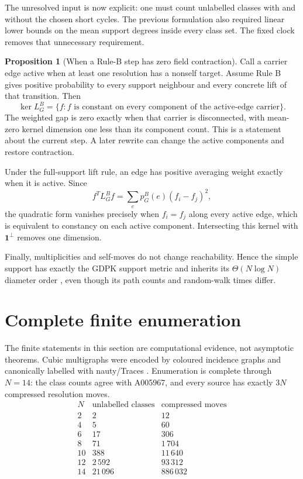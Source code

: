\documentclass[11pt]{article}
\makeatletter
\newcommand{\one}{\mathbf 1}
\theoremstyle{definition}
\newtheorem{proposition}[theorem]{Proposition}
\renewenvironment{proof}[1][\proofname]{\par
  \pushQED{\qed}%
  \normalfont \topsep6\p@\@plus6\p@\relax
  \trivlist
  \item[\hskip\labelsep\bfseries #1\@addpunct{.}]\ignorespaces
}{%
  \popQED\endtrivlist\@endpefalse
}
\makeatother
\begin{document}
The unresolved input is now explicit: one must count unlabelled classes with
and without the chosen short cycles.  The previous formulation also required
linear lower bounds on the mean support degrees inside every class set.  The
fixed clock removes that unnecessary requirement.

\begin{proposition}[When a Rule-B step has zero field contraction]
Call a carrier edge active when at least one resolution has a nonself target.
Assume Rule B gives positive probability to every support neighbour and every
concrete lift of that transition.  Then
\[
 \ker L_G^B
 =\{f:f\text{ is constant on every component of the active-edge carrier}\}.
\]
The weighted gap is zero exactly when that carrier is disconnected, with
mean-zero kernel dimension one less than its component count.  This is a
statement about the current step.  A later rewrite can change the active
components and restore contraction.
\end{proposition}

\begin{proof}
Under the full-support lift rule, an edge has positive averaging weight exactly
when it is active.  Since
\[
 f^TL_G^Bf=\sum_e p_G^B(e)(f_i-f_j)^2,
\]
the quadratic form vanishes precisely when $f_i=f_j$ along every active edge,
which is equivalent to constancy on each active component.  Intersecting this
kernel with $\one^\perp$ removes one dimension.
\end{proof}

Finally, multiplicities and self-moves do not change reachability.  Hence the
simple support has exactly the GDPK support metric and inherits its
$\Theta(N\log N)$ diameter order \cite{rafi-tao}, even though its path counts
and random-walk times differ.

\section{Complete finite enumeration}

The finite statements in this section are computational evidence, not
asymptotic theorems.  Cubic multigraphs were encoded by coloured incidence
graphs and canonically labelled with nauty/Traces \cite{mckay-nauty}.
Enumeration is complete through $N=14$: the class counts agree with
A005967, and every source has exactly $3N$ compressed resolution moves.
\[
\begin{array}{c|r|r}
N&\text{unlabelled classes}&\text{compressed moves}\\ \hline
2&2&12\\
4&5&60\\
6&17&306\\
8&71&1\,704\\
10&388&11\,640\\
12&2\,592&93\,312\\
14&21\,096&886\,032
\end{array}
\]
\end{document}
